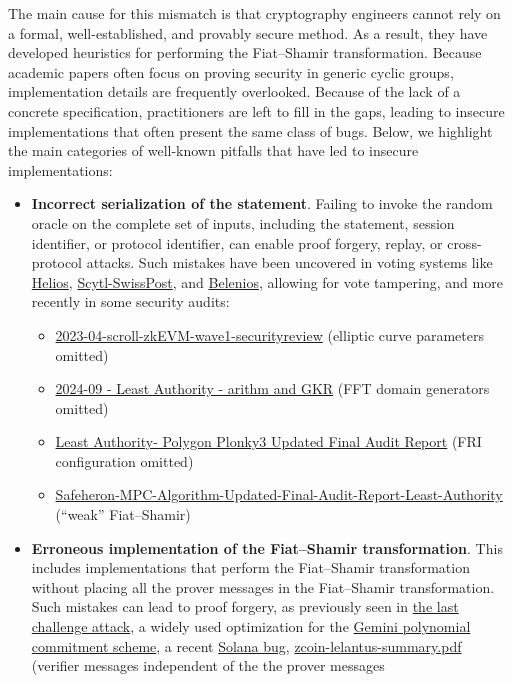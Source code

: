 \documentclass{article}
\begin{document}
The main cause for this mismatch is that cryptography engineers cannot rely on a formal, well-established, and provably secure method. As a result, they have developed heuristics for performing the Fiat--Shamir transformation. Because academic papers often focus on proving security in generic cyclic groups, implementation details are frequently overlooked. Because of the lack of a concrete specification, practitioners are left to fill in the gaps, leading to insecure implementations that often present the same class of bugs. Below, we highlight the main categories of well-known pitfalls that have led to insecure implementations:

\begin{itemize}
    \item \textbf{Incorrect serialization of the statement}. Failing to invoke the random oracle on the complete set of inputs, including the statement, session identifier, or protocol identifier, can enable proof forgery, replay, or cross-protocol attacks. Such mistakes have been uncovered in voting systems like \href{https://eprint.iacr.org/2016/771}{Helios}, \href{https://ieeexplore.ieee.org/document/9152765}{Scytl-SwissPost}, and \href{https://inria.hal.science/hal-02928953/file/final.pdf}{Belenios}, allowing for vote tampering, and more recently in some security audits:
    \begin{itemize}
    \item
\href{https://github.com/trailofbits/publications/blob/master/reviews/2023-04-scroll-zkEVM-wave1-securityreview.pdf}{\textsf{2023-04-scroll-zkEVM-wave1-securityreview}} (elliptic curve parameters omitted)
\item \href{https://github.com/Consensys/gnark/blob/master/audits/2024-09\%20-\%20Least\%20Authority\%20-\%20arithm\%20and\%20GKR.pdf}{\textsf{2024-09 - Least Authority - arithm and GKR}} (FFT domain generators omitted)
\item \href{https://leastauthority.com/wp-content/uploads/2024/11/Updated\_071124\_Polygon\_Plonky3\_Final\_Audit\_Report.pdf}{\textsf{Least Authority- Polygon Plonky3 Updated Final Audit Report}} (FRI configuration omitted)
\item \href{https://leastauthority.com/wp-content/uploads/2023/10/Safeheron_MPC_Algorithm_Updated_Final_Audit_Report_Least_Authority.pdf}{\textsf{Safeheron-MPC-Algorithm-Updated-Final-Audit-Report-Least-Authority}} (``weak'' Fiat--Shamir)
    \end{itemize}
    \item \textbf{Erroneous implementation of the Fiat--Shamir transformation}. This includes implementations that perform the Fiat--Shamir transformation without placing all the prover messages in the Fiat--Shamir transformation. Such mistakes can lead to proof forgery, as previously seen in \href{https://www.youtube.com/watch?v=Sk-S8-n6Jo4}{the last challenge attack}, a widely used optimization for the \href{https://eprint.iacr.org/2025/565}{Gemini polynomial commitment scheme}, a recent \href{https://t.co/RFaHQOtAAq}{Solana bug},
    \href{https://github.com/trailofbits/publications/blob/master/reviews/zcoin-lelantus-summary.pdf}{zcoin-lelantus-summary.pdf} (verifier messages independent of the the prover messages



\end{itemize}
\end{document}

